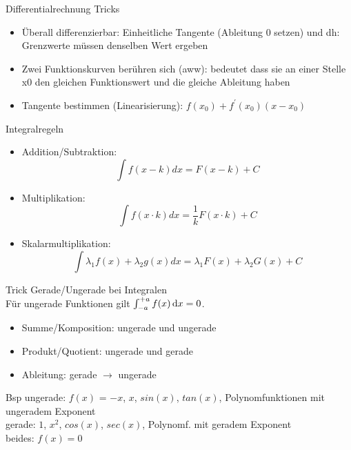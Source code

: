     \begin{KR}{Differentialrechnung Tricks}
        \begin{itemize}
      \item Überall differenzierbar: Einheitliche Tangente (Ableitung 0 setzen) und dh: Grenzwerte müssen denselben Wert ergeben
      \item Zwei Funktionskurven berühren sich (aww): bedeutet dass sie an einer Stelle x0 den gleichen Funktionswert und die gleiche Ableitung haben
      \item Tangente bestimmen (Linearisierung): $f\left(x_{0}\right)+f^{\prime}\left(x_{0}\right)\left(x-x_{0}\right)$
    \end{itemize}
    \end{KR}


\begin{concept}{Integralregeln}
    \begin{itemize}
      \item Addition/Subtraktion:
      $$\int f(x-k) d x=F(x-k)+C$$
      \item Multiplikation:
      $$\int f(x \cdot k) d x=\frac{1}{k} F(x \cdot k)+C$$
      \item Skalarmultiplikation:
      $$\int \lambda_{1} f(x)+\lambda_{2} g(x) d x=\lambda_{1} F(x)+\lambda_{2} G(x)+C$$
    \end{itemize}
\end{concept}

\begin{KR}{Trick Gerade/Ungerade bei Integralen}\\
    Für ungerade Funktionen gilt $\int_{-a}^{+a} f(x) \dif x = 0$.
    \begin{itemize}
        \item Summe/Komposition: ungerade und ungerade
        \item Produkt/Quotient: ungerade und gerade
        \item Ableitung: gerade $\longrightarrow$ ungerade
    \end{itemize}
    Bsp ungerade: $f(x)$ = $-x$, $x$, $sin(x)$, $tan(x)$, Polynomfunktionen mit ungeradem Exponent\\
    gerade: $1$, $x^2$, $cos(x)$, $sec(x)$, Polynomf. mit geradem Exponent\\
    beides: $f(x) = 0$
\end{KR}

\columnbreak



